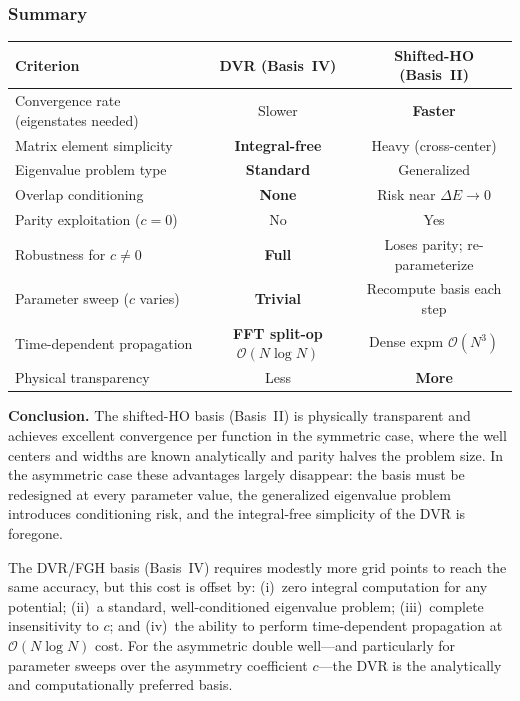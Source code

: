 \subsubsection{Summary}

\begin{center}
\renewcommand{\arraystretch}{1.4}
\begin{tabular}{lcc}
  \toprule
  Criterion & DVR (Basis~IV) & Shifted-HO (Basis~II) \\
  \midrule
  Convergence rate (eigenstates needed) & Slower & \textbf{Faster} \\
  Matrix element simplicity & \textbf{Integral-free} & Heavy (cross-center) \\
  Eigenvalue problem type & \textbf{Standard} & Generalized \\
  Overlap conditioning & \textbf{None} & Risk near $\Delta E \to 0$ \\
  Parity exploitation ($c=0$) & No & Yes \\
  Robustness for $c \neq 0$ & \textbf{Full} & Loses parity; re-parameterize \\
  Parameter sweep ($c$ varies) & \textbf{Trivial} & Recompute basis each step \\
  Time-dependent propagation & \textbf{FFT split-op} $\mathcal{O}(N\log N)$ & Dense expm $\mathcal{O}(N^3)$ \\
  Physical transparency & Less & \textbf{More} \\
  \bottomrule
\end{tabular}
\end{center}

\textbf{Conclusion.}
The shifted-HO basis (Basis~II) is physically transparent and achieves excellent
convergence per function in the symmetric case, where the well centers and widths are
known analytically and parity halves the problem size.  In the asymmetric case these
advantages largely disappear: the basis must be redesigned at every parameter value,
the generalized eigenvalue problem introduces conditioning risk, and the integral-free
simplicity of the DVR is foregone.

The DVR/FGH basis (Basis~IV) requires modestly more grid points to reach the same
accuracy, but this cost is offset by: (i)~zero integral computation for any potential;
(ii)~a standard, well-conditioned eigenvalue problem; (iii)~complete insensitivity to
$c$; and (iv)~the ability to perform time-dependent propagation at $\mathcal{O}(N\log N)$
cost.  For the asymmetric double well---and particularly for parameter sweeps over the
asymmetry coefficient $c$---the DVR is the analytically and computationally preferred basis.

